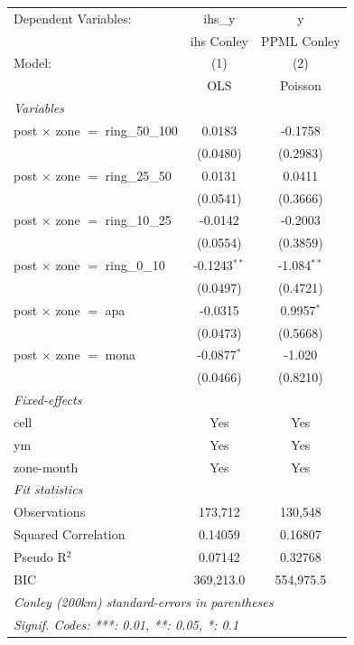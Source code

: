 
\begingroup
\centering
\begin{tabular}{lcc}
   \tabularnewline \midrule \midrule
   Dependent Variables:                    & ihs\_y         & y\\  
                                           & ihs Conley     & PPML Conley \\   
   Model:                                  & (1)            & (2)\\  
                                           &  OLS           & Poisson\\  
   \midrule
   \emph{Variables}\\
   post $\times$ zone $=$ ring\_50\_100    & 0.0183         & -0.1758\\   
                                           & (0.0480)       & (0.2983)\\   
   post $\times$ zone $=$ ring\_25\_50     & 0.0131         & 0.0411\\   
                                           & (0.0541)       & (0.3666)\\   
   post $\times$ zone $=$ ring\_10\_25     & -0.0142        & -0.2003\\   
                                           & (0.0554)       & (0.3859)\\   
   post $\times$ zone $=$ ring\_0\_10      & -0.1243$^{**}$ & -1.084$^{**}$\\   
                                           & (0.0497)       & (0.4721)\\   
   post $\times$ zone $=$ apa              & -0.0315        & 0.9957$^{*}$\\   
                                           & (0.0473)       & (0.5668)\\   
   post $\times$ zone $=$ mona             & -0.0877$^{*}$  & -1.020\\   
                                           & (0.0466)       & (0.8210)\\   
   \midrule
   \emph{Fixed-effects}\\
   cell                                    & Yes            & Yes\\  
   ym                                      & Yes            & Yes\\  
   zone-month                              & Yes            & Yes\\  
   \midrule
   \emph{Fit statistics}\\
   Observations                            & 173,712        & 130,548\\  
   Squared Correlation                     & 0.14059        & 0.16807\\  
   Pseudo R$^2$                            & 0.07142        & 0.32768\\  
   BIC                                     & 369,213.0      & 554,975.5\\  
   \midrule \midrule
   \multicolumn{3}{l}{\emph{Conley (200km) standard-errors in parentheses}}\\
   \multicolumn{3}{l}{\emph{Signif. Codes: ***: 0.01, **: 0.05, *: 0.1}}\\
\end{tabular}
\par\endgroup


